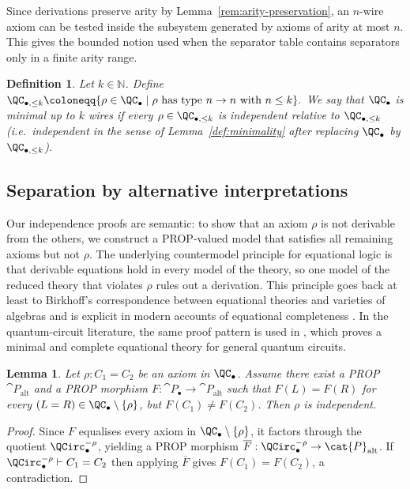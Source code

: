 \documentclass[10pt,a4paper]{article}
\newtheorem{lemma}[theorem]{Lemma}
\newtheorem{definition}[theorem]{Definition}
\def\cref#1{Lemma~\ref{#1}}%
\begin{document}
Since derivations preserve arity by \cref{rem:arity-preservation}, an \(n\)-wire axiom can be tested
inside the subsystem generated by axioms of arity at most \(n\).  This gives the bounded notion used
when the separator table contains separators only in a finite arity range.

\begin{definition}\label{def:bounded-minimality}
Let \(k\in\mathbb{N}\).  Define
\(
  \QC_{\bullet,\le k}
   \coloneqq 
  \{ \rho\in\QC_\bullet \mid \rho \text{ has type } n\to n \text{ with } n\le k \}.
\)
We say that \(\QC_\bullet\) is minimal up to \(k\) wires if every \(\rho\in\QC_{\bullet,\le k}\) is independent
relative to \(\QC_{\bullet,\le k}\) (i.e.\ independent in the sense of \cref{def:minimality} after replacing
\(\QC_\bullet\) by \(\QC_{\bullet,\le k}\)).
\end{definition}

\subsection{Separation by alternative interpretations}

Our independence proofs are semantic: to show that an axiom \(\rho\) is not derivable from the others,
we construct a PROP-valued model that satisfies all remaining axioms but not \(\rho\).  The underlying
countermodel principle for equational logic is that derivable equations hold in every model of the
theory, so one model of the reduced theory that violates \(\rho\) rules out a derivation.  This
principle goes back at least to Birkhoff's correspondence between equational theories and varieties
of algebras \cite{Birkhoff1935} and is explicit in modern accounts of equational completeness
\cite[Thm.~14.19]{BurrisSankappanavar1981}.  In the quantum-circuit literature, the same proof
pattern is used in \cite{ClementDelormePerdrix2023}, which proves a minimal and complete
equational theory for general quantum circuits.

\begin{lemma}\label{lem:separation}
Let \(\rho:C_1=C_2\) be an axiom in \(\QC_\bullet\).  Assume there exist a PROP
\(\cat{P}_{\mathrm{alt}}\) and a PROP morphism \(F:\cat{P}_\bullet\to\cat{P}_{\mathrm{alt}}\) such that
\(F(L)=F(R)\) for every \((L=R)\in\QC_\bullet\setminus\{\rho\}\), but \(F(C_1)\neq F(C_2)\).  Then
\(\rho\) is independent.
\end{lemma}

\begin{proof}
Since \(F\) equalises every axiom in \(\QC_\bullet\setminus\{\rho\}\), it factors through the quotient
\(\QCirc_\bullet^{-\rho}\), yielding a PROP morphism
\(\overline{F}:\QCirc_\bullet^{-\rho}\to\cat{P}_{\mathrm{alt}}\).
If \(\QCirc_\bullet^{-\rho}\vdash C_1=C_2\) then applying \(\overline{F}\) gives \(F(C_1)=F(C_2)\), a contradiction.
\end{proof}
\end{document}
